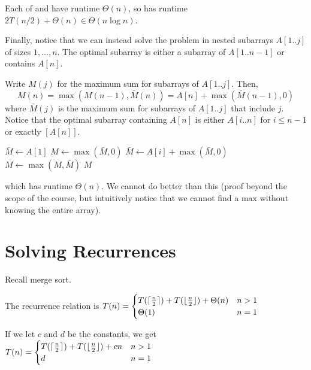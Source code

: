 Each of  and  have runtime $\Theta(n)$,
so  has runtime $2T(n/2) + \Theta(n) \in \Theta(n\log n)$.

Finally, notice that we can instead solve the problem in nested subarrays $A[1..j]$ of sizes $1,\dotsc,n$.
The optimal subarray is either a subarray of $A[1..n-1]$ or contains $A[n]$.

Write $M(j)$ for the maximum sum for subarrays of $A[1..j]$. Then,
\[ M(n) = \max(M(n-1), \bar M(n)) = A[n] + \max(\bar M(n-1), 0) \]
where $\bar M(j)$ is the maximum sum for subarrays of $A[1..j]$ that include $j$.
Notice that the optimal subarray containing $A[n]$ is either $A[i..n]$ for $i \leq n-1$
or exactly $[A[n]]$.

\begin{algorithm}[H]
  \caption{}
  \begin{algorithmic}[1]
    \State $\bar M \gets A[1]$
    \State $M \gets \max(\bar M, 0)$
    \State $\bar M \gets A[i] + \max(\bar M, 0)$
    \State $M \gets \max(M, \bar M)$
    \EndFor
    \State \Return $M$
  \end{algorithmic}
\end{algorithm}

which has runtime $\Theta(n)$.
We cannot do better than this (proof beyond the scope of the course,
but intuitively notice that we cannot find a max without knowing the entire array).

\chapter{Solving Recurrences}

Recall merge sort.

The recurrence relation is $T(n) = \begin{cases}
    T(\lceil\frac{n}{2}\rceil) + T(\lfloor\frac{n}{2}\rfloor) + \Theta(n) & n > 1 \\
    \Theta(1)                                                  & n = 1
  \end{cases}$

If we let $c$ and $d$ be the constants, we get $T(n) = \begin{cases}
    T(\lceil\frac{n}{2}\rceil) + T(\lfloor\frac{n}{2}\rfloor) + cn & n > 1 \\
    d                                                   & n = 1
  \end{cases}$


